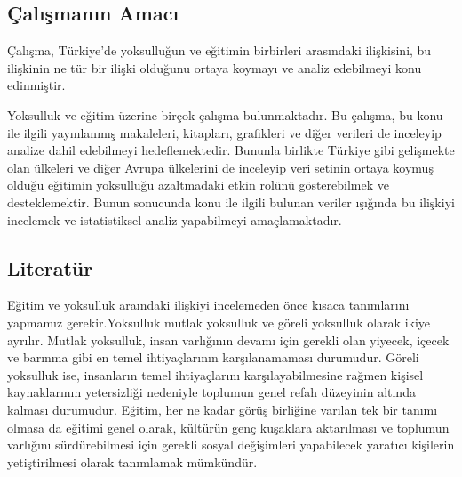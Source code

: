 \documentclass[
  12pt,
]{article}
\begin{document}
\hypertarget{uxe7alux131ux15fmanux131n-amacux131}{%
\subsection{Çalışmanın Amacı}\label{uxe7alux131ux15fmanux131n-amacux131}}

Çalışma, Türkiye'de yoksulluğun ve eğitimin birbirleri arasındaki ilişkisini, bu ilişkinin ne tür bir ilişki olduğunu ortaya koymayı ve analiz edebilmeyi konu edinmiştir.

Yoksulluk ve eğitim üzerine birçok çalışma bulunmaktadır. Bu çalışma, bu konu ile ilgili yayınlanmış makaleleri, kitapları, grafikleri ve diğer verileri de inceleyip analize dahil edebilmeyi hedeflemektedir. Bununla birlikte Türkiye gibi gelişmekte olan ülkeleri ve diğer Avrupa ülkelerini de inceleyip veri setinin ortaya koymuş olduğu eğitimin yoksulluğu azaltmadaki etkin rolünü gösterebilmek ve desteklemektir. Bunun sonucunda konu ile ilgili bulunan veriler ışığında bu ilişkiyi incelemek ve istatistiksel analiz yapabilmeyi amaçlamaktadır.

\hypertarget{literatuxfcr}{%
\subsection{Literatür}\label{literatuxfcr}}

Eğitim ve yoksulluk araındaki ilişkiyi incelemeden önce kısaca tanımlarını yapmamız gerekir.Yoksulluk mutlak yoksulluk ve göreli yoksulluk olarak ikiye ayrılır. Mutlak yoksulluk, insan varlığının devamı için gerekli olan yiyecek, içecek ve barınma gibi en temel ihtiyaçlarının karşılanamaması durumudur. Göreli yoksulluk ise, insanların temel ihtiyaçlarını karşılayabilmesine rağmen kişisel kaynaklarının yetersizliği nedeniyle toplumun genel refah düzeyinin altında kalması durumudur. Eğitim, her ne kadar görüş birliğine varılan tek bir tanımı olmasa da eğitimi genel olarak, kültürün genç kuşaklara aktarılması ve toplumun varlığını sürdürebilmesi için gerekli sosyal değişimleri yapabilecek yaratıcı kişilerin yetiştirilmesi olarak tanımlamak mümkündür.
\end{document}
